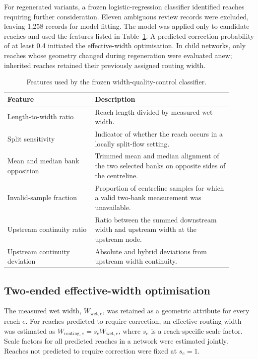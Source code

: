 For regenerated variants, a frozen logistic-regression classifier identified reaches requiring further consideration. Eleven ambiguous review records were excluded, leaving 1,258 records for model fitting. The model was applied only to candidate reaches and used the features listed in Table~\ref{tab:width_qc_features}. A predicted correction probability of at least 0.4 initiated the effective-width optimisation. In child networks, only reaches whose geometry changed during regeneration were evaluated anew; inherited reaches retained their previously assigned routing width.

\begin{table}[ht]
\centering
\caption{Features used by the frozen width-quality-control classifier.}
\label{tab:width_qc_features}
\begin{tabular}{p{0.35\linewidth}p{0.55\linewidth}}
\hline
Feature & Description \\
\hline
Length-to-width ratio & Reach length divided by measured wet width. \\
Split sensitivity & Indicator of whether the reach occurs in a locally split-flow setting. \\
Mean and median bank opposition & Trimmed mean and median alignment of the two selected banks on opposite sides of the centreline. \\
Invalid-sample fraction & Proportion of centreline samples for which a valid two-bank measurement was unavailable. \\
Upstream continuity ratio & Ratio between the summed downstream width and upstream width at the upstream node. \\
Upstream continuity deviation & Absolute and hybrid deviations from upstream width continuity. \\
\hline
\end{tabular}
\end{table}

\subsection{Two-ended effective-width optimisation}

The measured wet width, $W_{\mathrm{wet},e}$, was retained as a geometric attribute for every reach $e$. For reaches predicted to require correction, an effective routing width was estimated as $W_{\mathrm{routing},e}=s_eW_{\mathrm{wet},e}$, where $s_e$ is a reach-specific scale factor. Scale factors for all predicted reaches in a network were estimated jointly. Reaches not predicted to require correction were fixed at $s_e=1$.


